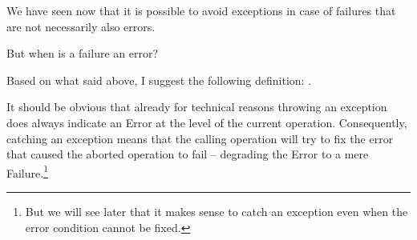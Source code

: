 We have seen now that it is possible to avoid exceptions in case of failures that are not necessarily also errors.

But when is a failure an error?

Based on what said above, I suggest the following definition: .

It should be obvious that already for technical reasons throwing an exception does always indicate an Error at the level of the current operation. Consequently, catching an exception means that the calling operation will try to fix the error that caused the aborted operation to fail – degrading the Error to a mere Failure.\footnote{But we will see later that it makes sense to catch an exception even when the error condition cannot be fixed.}


